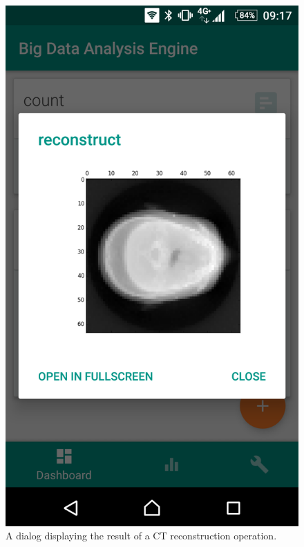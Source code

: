 \begin{figure}[h!]
\begin{minipage}[b]{0.4\textwidth}
    		\includegraphics[width=\textwidth]{img/result.png}
    		\caption[]{A dialog displaying the result of a CT reconstruction operation.}
  	\end{minipage}
\end{figure}